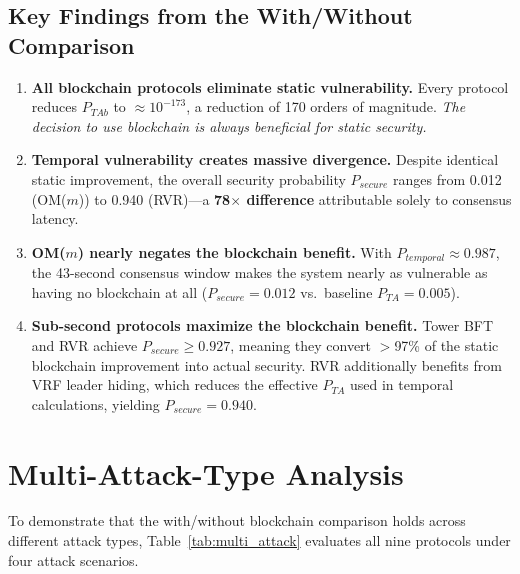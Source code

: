 \documentclass[10pt,twocolumn,letterpaper]{article}
\begin{document}
\subsection{Key Findings from the With/Without Comparison}

\begin{enumerate}[leftmargin=*]
    \item \textbf{All blockchain protocols eliminate static vulnerability.} Every protocol reduces $P_{TAb}$ to $\approx 10^{-173}$, a reduction of 170 orders of magnitude. \emph{The decision to use blockchain is always beneficial for static security.}

    \item \textbf{Temporal vulnerability creates massive divergence.} Despite identical static improvement, the overall security probability $P_{secure}$ ranges from 0.012 (OM($m$)) to 0.940 (RVR)---a \textbf{78$\times$ difference} attributable solely to consensus latency.

    \item \textbf{OM($m$) nearly negates the blockchain benefit.} With $P_{temporal} \approx 0.987$, the 43-second consensus window makes the system nearly as vulnerable as having no blockchain at all ($P_{secure} = 0.012$ vs.\ baseline $P_{TA} = 0.005$).

    \item \textbf{Sub-second protocols maximize the blockchain benefit.} Tower BFT and RVR achieve $P_{secure} \geq 0.927$, meaning they convert $>$97\% of the static blockchain improvement into actual security. RVR additionally benefits from VRF leader hiding, which reduces the effective $P_{TA}$ used in temporal calculations, yielding $P_{secure} = 0.940$.
\end{enumerate}

\section{Multi-Attack-Type Analysis}
\label{sec:multi_attack}

To demonstrate that the with/without blockchain comparison holds across different attack types, Table~\ref{tab:multi_attack} evaluates all nine protocols under four attack scenarios.
\end{document}
